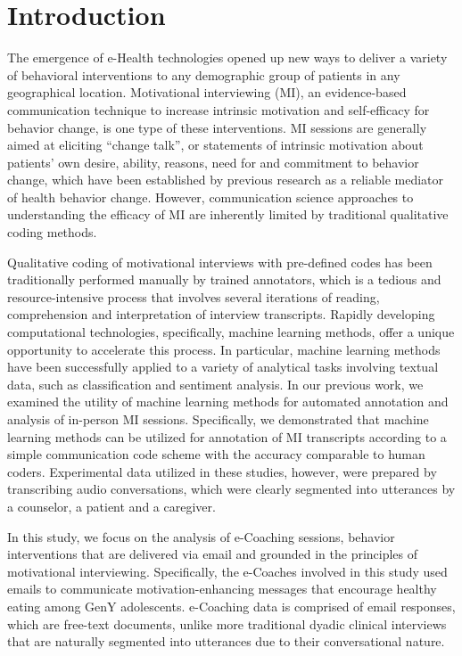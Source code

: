 \documentclass{amia}
\begin{document}
\section*{Introduction}
The emergence of e-Health technologies opened up new ways to deliver a variety of behavioral interventions to any demographic group of patients in any geographical location. Motivational interviewing (MI), an evidence-based communication technique to increase intrinsic motivation and self-efficacy for behavior change\cite{miller2012motivational,miller2009ten,miller2009toward}, is one type of these interventions. MI sessions are generally aimed at eliciting ``change talk'', or statements of intrinsic motivation about patients' own desire, ability, reasons, need for and commitment to behavior change, which have been established by previous research\cite{apodaca2009mechanisms} as a reliable mediator of health behavior change. However, communication science approaches to understanding the efficacy of MI are inherently limited by traditional qualitative coding methods. 

Qualitative coding of motivational interviews with pre-defined codes has been traditionally performed manually by trained annotators, which is a tedious and resource-intensive process that involves several iterations of reading, comprehension and interpretation of interview transcripts. Rapidly developing computational technologies, specifically, machine learning methods, offer a unique opportunity to accelerate this process. In particular, machine learning methods have been successfully applied to a variety of analytical tasks involving textual data, such as classification\cite{nigam2000text} and sentiment analysis\cite{wang2012baselines}. In our previous work, we examined the utility of machine learning methods for automated annotation \cite{hasan2016study,kotov2015interpretable} and analysis \cite{hasan2018predicting} of in-person MI sessions. Specifically, we demonstrated that machine learning methods can be utilized for annotation of MI transcripts according to a simple communication code scheme with the accuracy comparable to human coders\cite{hasan2016study}. Experimental data utilized in these studies, however, were prepared by transcribing audio conversations, which were clearly segmented into utterances by a counselor, a patient and a caregiver. 

In this study, we focus on the analysis of e-Coaching sessions, behavior interventions that are delivered via email and grounded in the principles of motivational interviewing. Specifically, the e-Coaches involved in this study used emails to communicate motivation-enhancing messages that encourage healthy eating among GenY adolescents. e-Coaching data is comprised of email responses, which are free-text documents, unlike more traditional dyadic clinical interviews that are naturally segmented into utterances due to their conversational nature.
\end{document}
